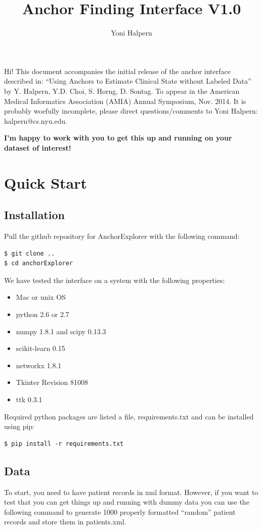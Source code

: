 \documentclass[12pt]{article}
\title{Anchor Finding Interface V1.0}
\author{Yoni Halpern}
\begin{document}
 
\maketitle{}
 

Hi! This document accompanies the initial release of the anchor interface described in: ``Using Anchors to Estimate Clinical State without Labeled Data'' by Y. Halpern, Y.D. Choi, S. Horng, D. Sontag. To appear in the American Medical Informatics Association (AMIA) Annual Symposium, Nov. 2014. It is probably woefully incomplete, please direct questions/comments to Yoni Halpern: halpern@cs.nyu.edu. 

{\bf I'm happy to work with you to get this up and running on your dataset of interest!}



\section{Quick Start}

\subsection{Installation}
Pull the github repository for AnchorExplorer with the following command:

\begin{verbatim}
$ git clone ..
$ cd anchorExplorer
\end{verbatim}

We have tested the interface on a system with the following properties:
\begin{itemize}
\item Mac or unix OS
\item python 2.6 or 2.7
\item numpy 1.8.1 and scipy 0.13.3
\item scikit-learn 0.15
\item networkx 1.8.1
\item Tkinter Revision 81008
\item ttk 0.3.1
\end{itemize}

Required python packages are listed a file, requirements.txt and can be installed using pip:

\begin{verbatim}
$ pip install -r requirements.txt
\end{verbatim}

\subsection{Data}
To start, you need to have patient records in xml format. 
However, if you want to test that you can get things up and running with dummy data you can use the following command to generate 1000 properly formatted ``random'' patient records and store them in patients.xml.
\end{document}
